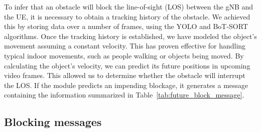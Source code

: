To infer that an obstacle will block the line-of-sight (LOS) between the gNB and the UE, it is necessary to obtain a tracking history of the obstacle.
We achieved this by storing data over a number of frames, using the YOLO and BoT-SORT algorithms.
Once the tracking history is established, we have modeled the object's movement assuming a constant velocity.
This has proven effective for handling typical indoor movements, such as people walking or objects being moved.
By calculating the object's velocity, we can predict its future positions in upcoming video frames.
This allowed us to determine whether the obstacle will interrupt the LOS\@.
If the module predicts an impending blockage, it generates a message containing the information summarized in Table~\ref{tab:future_block_message}.


\begin{table}[H]
    \caption{Components of the Prediction of Blockage Payload}
    \label{tab:future_block_message}
    \centering
\end{table}




\subsection{Blocking messages}\label{subsec:blocking-messages}

